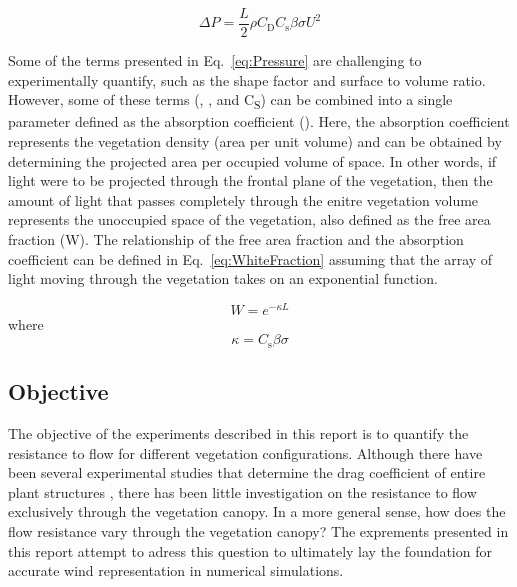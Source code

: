 \documentclass[12pt]{article}
\begin{document}
\begin{equation}\label{eq:Pressure}
\Delta P  = \frac{L}{2} \rho C_{\mathrm{D}} C_{\mathrm{s}} \beta \sigma {U}^2
\end{equation} 

Some of the terms presented in Eq.~\ref{eq:Pressure} are challenging to experimentally quantify, such as the shape factor and surface to volume ratio. However, some of these terms (\textsigma, \textbeta, and C\textsubscript{S}) can be combined into a single parameter defined as the absorption coefficient (\textkappa). Here, the absorption coefficient represents the vegetation density (area per unit volume) and can be obtained by determining the projected area per occupied volume of space. In other words, if light were to be projected through the frontal plane of the vegetation, then the amount of light that passes completely through the enitre vegetation volume represents the unoccupied space of the vegetation, also defined as the free area fraction (W). The relationship of the free area fraction and the absorption coefficient can be defined in Eq.~\ref{eq:WhiteFraction} assuming that the array of light moving through the vegetation takes on an exponential function. 

\begin{equation}\label{eq:WhiteFraction}
W = e^{-\kappa L}
\end{equation} 
where
\begin{equation}\label{eq:Kappa}
 \kappa = C_{\mathrm{s}} \beta \sigma
\end{equation} 


\subsection{Objective}
\label{ssec:headingscap}
The objective of the experiments described in this report is to quantify the resistance to flow for different vegetation configurations. Although there have been several experimental studies that determine the drag coefficient of entire plant structures \cite{Cao2012,Jalonen2014,Mayhead1973,Gillies2002,Ishikawa2006}, there has been little investigation on the resistance to flow exclusively through the vegetation canopy. In a more general sense, how does the flow resistance vary through the vegetation canopy?  The exprements presented in this report attempt to adress this question to ultimately lay the foundation for accurate wind representation in numerical simulations.
 \pagebreak
\end{document}
